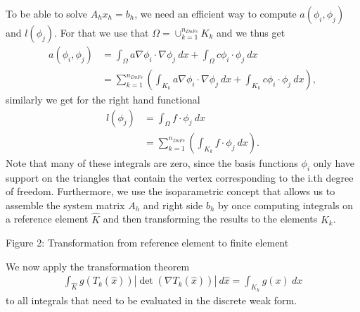 \documentclass[letterpaper,10pt,english, openany]{sphinxmanual}
\let\sphinxpxdimen\pdfpxdimen\else\newdimen\sphinxpxdimen
\begin{document}
To be able to solve \(A_h x_h = b_h\), we need an efficient way to compute \(a\left(\phi_i,\phi_j \right)\) and \(l\left(\phi_j \right)\).
For that we use that \(\Omega = \cup_{k = 1}^{n_{DoFs}}K_k\) and we thus get
\begin{equation*}
\begin{split}a(\phi_i,\phi_j) &= \int_{\Omega} a \nabla \phi_i \cdot \nabla \phi_j\ dx + \int_{\Omega} c \phi_i \cdot \phi_j\ dx \\
                &= \sum_{k = 1}^{n_{DoFs}} \left( \int_{K_k} a \nabla \phi_i \cdot \nabla \phi_j\ dx + \int_{K_k} c \phi_i \cdot \phi_j\ dx  \right),\end{split}
\end{equation*}
similarly we get for the right hand functional
\begin{equation*}
\begin{split}l(\phi_j) &= \int_{\Omega} f \cdot \phi_j\ dx \\
          &= \sum_{k = 1}^{n_{DoFs}} \left( \int_{K_k} f \cdot \phi_j\ dx \right).\end{split}
\end{equation*}
Note that many of these integrals are zero, since the basis functions \(\phi_i\) only have support on the triangles that contain the vertex corresponding
to the i.th degree of freedom. Furthermore, we use the isoparametric concept that allows us to assemble the {\color{blue}system matrix} \(A_h\) and {\color{blue}right side} \(b_h\)
by once computing integrals on a reference element \(\hat{K}\) and then transforming the results to the elements \(K_k\).

\begin{figure}[htbp]
\centering

\noindent\sphinxincludegraphics[width=294\sphinxpxdimen,height=159\sphinxpxdimen]{{trafo}.png}
\end{figure}

\begin{center}Figure 2: Transformation from reference element to finite element
\end{center}
We now apply the transformation theorem
\begin{equation*}
\begin{split}\int_{\hat{K}} g\left(T_k\left(\hat{x}\right)\right)\left|\det\left(\nabla T_k\left(\hat{x}\right)\right)\right|\ d\hat{x} = \int_{K_k} g\left(x\right)\ dx\end{split}
\end{equation*}
to all integrals that need to be evaluated in the discrete weak form.
\end{document}
